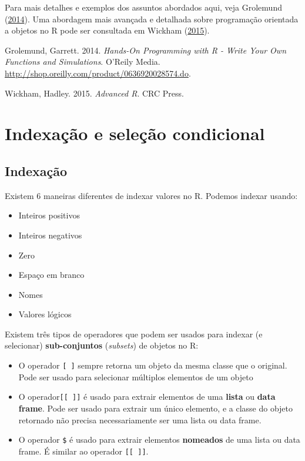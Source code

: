 \documentclass[10pt,a4paper]{book}
\providecommand{\tightlist}{%
  \setlength{\itemsep}{0pt}\setlength{\parskip}{0pt}}
\begin{document}
Para mais detalhes e exemplos dos assuntos abordados aqui, veja
Grolemund (\protect\hyperlink{ref-Grolemund2014}{2014}). Uma abordagem
mais avançada e detalhada sobre programação orientada a objetos no R
pode ser consultada em Wickham
(\protect\hyperlink{ref-Wickham2015}{2015}).

\hypertarget{refs}{}
\hypertarget{ref-Grolemund2014}{}
Grolemund, Garrett. 2014. \emph{Hands-On Programming with R - Write Your
Own Functions and Simulations}. O'Reily Media.
\url{http://shop.oreilly.com/product/0636920028574.do}.

\hypertarget{ref-Wickham2015}{}
Wickham, Hadley. 2015. \emph{Advanced R}. CRC Press.

\chapter{Indexação e seleção
condicional}\label{indexacao-e-selecao-condicional}

\section{Indexação}\label{indexacao}

Existem 6 maneiras diferentes de indexar valores no R. Podemos indexar
usando:

\begin{itemize}
\tightlist
\item
  Inteiros positivos
\item
  Inteiros negativos
\item
  Zero
\item
  Espaço em branco
\item
  Nomes
\item
  Valores lógicos
\end{itemize}

Existem três tipos de operadores que podem ser usados para indexar (e
selecionar) \textbf{sub-conjuntos} (\emph{subsets}) de objetos no R:

\begin{itemize}
\tightlist
\item
  O operador \texttt{{[}\ {]}} sempre retorna um objeto da mesma classe
  que o original. Pode ser usado para selecionar múltiplos elementos de
  um objeto
\item
  O operador\texttt{{[}{[}\ {]}{]}} é usado para extrair elementos de
  uma \textbf{lista} ou \textbf{data frame}. Pode ser usado para extrair
  um único elemento, e a classe do objeto retornado não precisa
  necessariamente ser uma lista ou data frame.
\item
  O operador \texttt{\$} é usado para extrair elementos
  \textbf{nomeados} de uma lista ou data frame. É similar ao operador
  \texttt{{[}{[}\ {]}{]}}.
\end{itemize}
\end{document}
